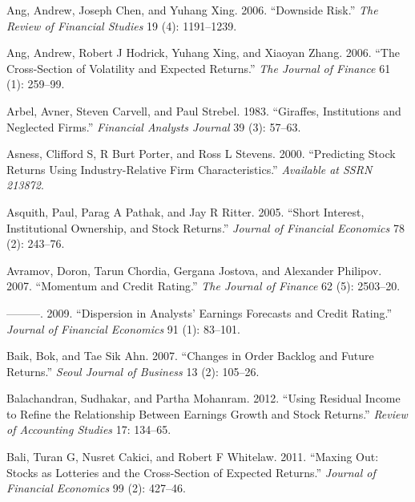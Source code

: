 \documentclass[
  letterpaper,
  DIV=11,
  numbers=noendperiod]{scrreprt}
\newlength{\cslhangindent}
\newlength{\cslentryspacingunit} %
\newenvironment{CSLReferences}[2] %
 {%
  \setlength{\parindent}{0pt}
  \ifodd #1
  \let\oldpar\par
  \def\par{\hangindent=\cslhangindent\oldpar}
  \fi
  \setlength{\parskip}{#2\cslentryspacingunit}
 }%
 {}
\begin{document}
\begin{CSLReferences}{1}{0}
\leavevmode{}%
Ang, Andrew, Joseph Chen, and Yuhang Xing. 2006. {``Downside Risk.''}
\emph{The Review of Financial Studies} 19 (4): 1191--1239.

\leavevmode{}%
Ang, Andrew, Robert J Hodrick, Yuhang Xing, and Xiaoyan Zhang. 2006.
{``The Cross-Section of Volatility and Expected Returns.''} \emph{The
Journal of Finance} 61 (1): 259--99.

\leavevmode{}%
Arbel, Avner, Steven Carvell, and Paul Strebel. 1983. {``Giraffes,
Institutions and Neglected Firms.''} \emph{Financial Analysts Journal}
39 (3): 57--63.

\leavevmode{}%
Asness, Clifford S, R Burt Porter, and Ross L Stevens. 2000.
{``Predicting Stock Returns Using Industry-Relative Firm
Characteristics.''} \emph{Available at SSRN 213872}.

\leavevmode{}%
Asquith, Paul, Parag A Pathak, and Jay R Ritter. 2005. {``Short
Interest, Institutional Ownership, and Stock Returns.''} \emph{Journal
of Financial Economics} 78 (2): 243--76.

\leavevmode{}%
Avramov, Doron, Tarun Chordia, Gergana Jostova, and Alexander Philipov.
2007. {``Momentum and Credit Rating.''} \emph{The Journal of Finance} 62
(5): 2503--20.

\leavevmode{}%
---------. 2009. {``Dispersion in Analysts' Earnings Forecasts and
Credit Rating.''} \emph{Journal of Financial Economics} 91 (1): 83--101.

\leavevmode{}%
Baik, Bok, and Tae Sik Ahn. 2007. {``Changes in Order Backlog and Future
Returns.''} \emph{Seoul Journal of Business} 13 (2): 105--26.

\leavevmode{}%
Balachandran, Sudhakar, and Partha Mohanram. 2012. {``Using Residual
Income to Refine the Relationship Between Earnings Growth and Stock
Returns.''} \emph{Review of Accounting Studies} 17: 134--65.

\leavevmode{}%
Bali, Turan G, Nusret Cakici, and Robert F Whitelaw. 2011. {``Maxing
Out: Stocks as Lotteries and the Cross-Section of Expected Returns.''}
\emph{Journal of Financial Economics} 99 (2): 427--46.


\end{CSLReferences}
\end{document}
